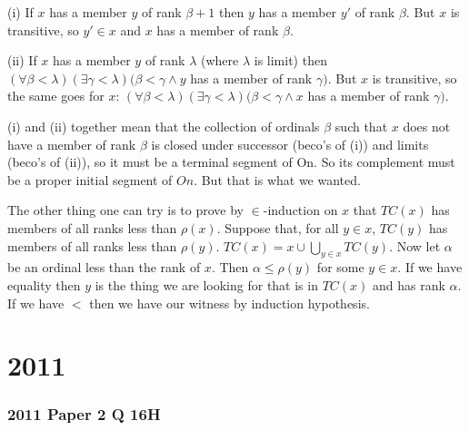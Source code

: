 \documentclass{book}
\begin{document}
\smallskip

(i) If $x$ has a member $y$ of rank $\beta +1$ then $y$ has a member
$y'$ of rank $\beta$.  But $x$ is transitive, so $y' \in x$ and $x$
has a member of rank $\beta$.

\smallskip

(ii) If $x$ has a member $y$ of rank $\lambda$ (where $\lambda$ is
limit) then $(\forall \beta < \lambda)(\exists \gamma < \lambda)(\beta
< \gamma \wedge y$ has a member of rank $\gamma)$.  But $x$ is
transitive, so the same goes for $x$: $(\forall \beta <
\lambda)(\exists \gamma < \lambda)(\beta < \gamma \wedge x$ has a
member of rank $\gamma)$.

\smallskip

(i) and (ii) together mean that the collection of ordinals $\beta$
such that $x$ does not have a member of rank $\beta$ is closed under
successor (beco's of (i)) and limits (beco's of (ii)), so it must be a
terminal segment of On.  So its complement must be a proper initial
segment of $On$.  But that is what we wanted.

\bigskip

The other thing one can try is to prove by $\in$-induction on $x$ that
$TC(x)$ has members of all ranks less than $\rho(x)$.  Suppose that,
for all $y \in x$, $TC(y)$ has members of all ranks less than
$\rho(y)$. $TC(x) = x \cup \bigcup_{y\in x} TC(y)$.  Now let $\alpha$
be an ordinal less than the rank of $x$.  Then $\alpha \leq \rho(y)$
for some $y \in x$.  If we have equality then $y$ is the thing we are
looking for that is in $TC(x)$ and has rank $\alpha$. If we have $<$
then we have our witness by induction hypothesis.

\chapter{2011}
\subsection*{2011 Paper 2 Q 16H}
\end{document}
